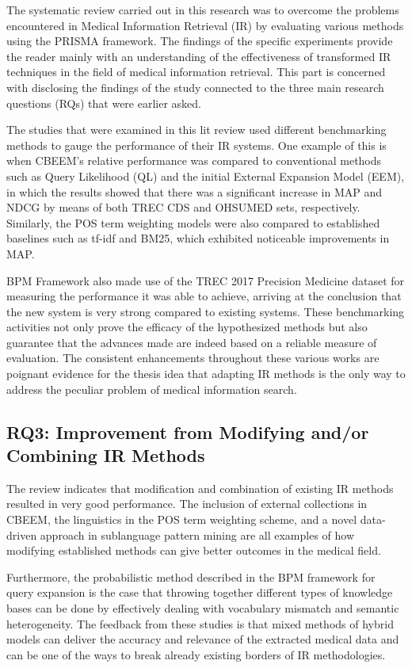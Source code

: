 \documentclass[conference]{IEEEtran}
\begin{document}
The systematic review carried out in this research was to overcome the problems encountered in Medical Information Retrieval (IR) by evaluating various methods using the PRISMA framework. The findings of the specific experiments provide the reader mainly with an understanding of the effectiveness of transformed IR techniques in the field of medical information retrieval. This part is concerned with disclosing the findings of the study connected to the three main research questions (RQs) that were earlier asked.

The studies that were examined in this lit review used different benchmarking methods to gauge the performance of their IR systems. One example of this is when CBEEM's relative performance was compared to conventional methods such as Query Likelihood (QL) and the initial External Expansion Model (EEM), in which the results showed that there was a significant increase in MAP and NDCG by means of both TREC CDS and OHSUMED sets, respectively. Similarly, the POS term weighting models were also compared to established baselines such as tf-idf and BM25, which exhibited noticeable improvements in MAP.

BPM Framework also made use of the TREC 2017 Precision Medicine dataset for measuring the performance it was able to achieve, arriving at the conclusion that the new system is very strong compared to existing systems. These benchmarking activities not only prove the efficacy of the hypothesized methods but also guarantee that the advances made are indeed based on a reliable measure of evaluation. The consistent enhancements throughout these various works are poignant evidence for the thesis idea that adapting IR methods is the only way to address the peculiar problem of medical information search.

\subsection{RQ3: Improvement from Modifying and/or Combining IR Methods}

The review indicates that modification and combination of existing IR methods resulted in very good performance. The inclusion of external collections in CBEEM, the linguistics in the POS term weighting scheme, and a novel data-driven approach in sublanguage pattern mining are all examples of how modifying established methods can give better outcomes in the medical field.

Furthermore, the probabilistic method described in the BPM framework for query expansion is the case that throwing together different types of knowledge bases can be done by effectively dealing with vocabulary mismatch and semantic heterogeneity. The feedback from these studies is that mixed methods of hybrid models can deliver the accuracy and relevance of the extracted medical data and can be one of the ways to break already existing borders of IR methodologies.
\end{document}
